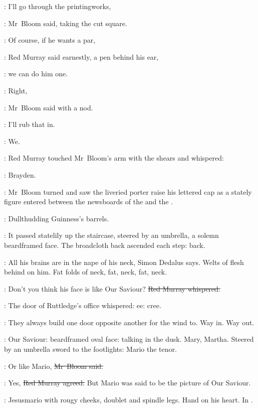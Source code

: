 \Bloom:
I'll go through the printingworks,

:
Mr~Bloom said,
taking the cut square.

\redmurray:
Of course, if he wants a par,

:
Red Murray said earnestly, a pen behind his ear,

\redmurray:
we can do him one.

\Bloom:
Right,

:
Mr~Bloom said with a nod.

\Bloom:
I'll rub that in.

\BloomInt:
We.



:
Red Murray touched Mr~Bloom's arm with the shears
and whispered:

\redmurray:
Brayden.

:
Mr~Bloom turned and saw the liveried porter raise his lettered cap
as a stately figure entered between the newsboards
of the 
and the .

:
Dullthudding Guinness's barrels.

:
It passed statelily up the staircase,
steered by an umbrella,
a solemn beardframed face.
The broadcloth back ascended each step: back.

\BloomInt:
All his brains are in the nape of his neck, Simon Dedalus says.
Welts of flesh behind on him.
Fat folds of neck, fat, neck, fat, neck.

\redmurray:
Don't you think his face is like Our Saviour?
\sout{Red Murray whispered.}

:
The door of Ruttledge's office whispered:
ee:
cree.

\BloomInt:
They always build one door opposite another for the wind to.
Way in.
Way out.

\BloomInt:
Our Saviour:
beardframed oval face:
talking in the dusk.
Mary, Martha.
Steered by an umbrella sword to the footlights:
Mario the tenor.

\Bloom:
Or like Mario,
\sout{Mr~Bloom said.}

\redmurray:
Yes,
\sout{Red Murray agreed.}
But Mario was said to be the picture of Our Saviour.

\BloomInt:
Jesusmario with rougy cheeks, doublet and spindle legs.
Hand on his heart.
In .

%


